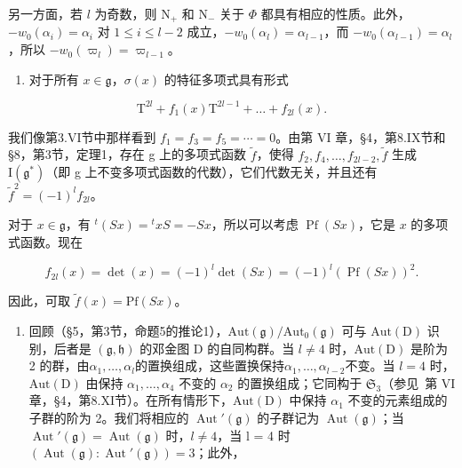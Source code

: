 另一方面，若 \(l\) 为奇数，则 \(\mathrm{N}_{+}\) 和 \(\mathrm{N}_{-}\) 关于 \(\varPhi\) 都具有相应的性质。此外，\(-w_{0}(\alpha_{i}) = \alpha_{i}\) 对 \(1 \leq i \leq l - 2\) 成立，\(-w_{0}(\alpha_{l}) = \alpha_{l - 1}\)，而 \(-w_{0}(\alpha_{l - 1}) = \alpha_{l}\)，所以 \(-w_{0}(\varpi_{l}) = \varpi_{l - 1}\)。

\begin{enumerate}
\def\labelenumi{(\Roman{enumi})}
\setcounter{enumi}{5}
\tightlist
\item
对于所有 \(x \in \mathfrak{g}\)，\(\sigma(x)\) 的特征多项式具有形式
\end{enumerate}

\[
\mathrm{T} ^ {2 l} + f _ {1} (x) \mathrm{T} ^ {2 l - 1} + \dots + f _ {2 l} (x).
\]

我们像第3.VI节中那样看到 \(f_{1}=f_{3}=f_{5}=\cdots=0\)。由第 VI 章，§4，第8.IX节和§8，第3节，定理1，存在 g 上的多项式函数 \(\tilde{f}\)，使得 \(f_{2}, f_{4}, \ldots, f_{2l-2}, \tilde{f}\) 生成 \(\mathrm{I}(\mathfrak{g}^{*})\)（即 g 上不变多项式函数的代数），它们代数无关，并且还有 \(\tilde{f}^{2}=(-1)^{l}f_{2l}\)。

对于 \(x \in \mathfrak{g}\)，有 \({}^t(Sx) = {}^t xS = -Sx\)，所以可以考虑 \(\operatorname{Pf}(Sx)\)，它是 \(x\) 的多项式函数。现在

\[
f _ {2 l} (x) = \det (x) = (- 1) ^ {l} \det (S x) = (- 1) ^ {l} (\operatorname{Pf} (S x)) ^ {2}.
\]

因此，可取 \(\tilde{f}(x) = \mathrm{Pf}(Sx)\)。

\begin{enumerate}
\def\labelenumi{(\Roman{enumi})}
\setcounter{enumi}{6}
\tightlist
\item
回顾（§5，第3节，命题5的推论1），\(\mathrm{Aut}(\mathfrak{g}) / \mathrm{Aut}_0(\mathfrak{g})\) 可与 \(\mathrm{Aut}(\mathrm{D})\) 识别，后者是 \((\mathfrak{g},\mathfrak{h})\) 的邓金图 D 的自同构群。当 \(l\neq 4\) 时，\(\mathrm{Aut}(\mathrm{D})\) 是阶为 2 的群，由\(\alpha_{1},\ldots ,\alpha_{l}\)的置换组成，这些置换保持\(\alpha_{1},\ldots ,\alpha_{l - 2}\)不变。当 \(l = 4\) 时，\(\mathrm{Aut}(\mathrm{D})\) 由保持 \(\alpha_{1},\ldots ,\alpha_{4}\) 不变的 \(\alpha_{2}\) 的置换组成；它同构于 \(\mathfrak{S}_3\)（参见~第 VI 章，§4，第8.XI节）。在所有情形下，\(\mathrm{Aut}(\mathrm{D})\) 中保持 \(\alpha_{1}\) 不变的元素组成的子群的阶为 2。我们将相应的 \(\operatorname{Aut}'(\mathfrak{g})\) 的子群记为 \(\operatorname{Aut}(\mathfrak{g})\)；当 \(\operatorname{Aut}'(\mathfrak{g}) = \operatorname{Aut}(\mathfrak{g})\) 时，\(l \neq 4\)，当 l = 4 时 \((\operatorname{Aut}(\mathfrak{g}) : \operatorname{Aut}'(\mathfrak{g})) = 3\)；此外，
\end{enumerate}

